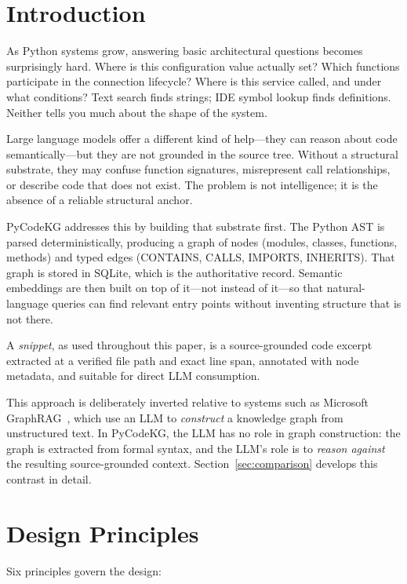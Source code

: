 \documentclass[10pt]{article}
\begin{document}
\section{Introduction}

As Python systems grow, answering basic architectural questions becomes surprisingly
hard. Where is this configuration value actually set? Which functions participate in
the connection lifecycle? Where is this service called, and under what conditions?
Text search finds strings; IDE symbol lookup finds definitions. Neither tells you
much about the shape of the system.

Large language models offer a different kind of help---they can reason about code
semantically---but they are not grounded in the source tree. Without a structural
substrate, they may confuse function signatures, misrepresent call relationships,
or describe code that does not exist. The problem is not intelligence; it is the
absence of a reliable structural anchor.

PyCodeKG addresses this by building that substrate first. The Python AST is parsed
deterministically, producing a graph of nodes (modules, classes, functions, methods)
and typed edges (CONTAINS, CALLS, IMPORTS, INHERITS). That graph is stored in
SQLite, which is the authoritative record. Semantic embeddings are then built on top
of it---not instead of it---so that natural-language queries can find relevant
entry points without inventing structure that is not there.

A \emph{snippet}, as used throughout this paper, is a source-grounded code excerpt
extracted at a verified file path and exact line span, annotated with node metadata,
and suitable for direct LLM consumption.

This approach is deliberately inverted relative to systems such as Microsoft
GraphRAG~\cite{edge2024graphrag}, which use an LLM to \emph{construct} a knowledge
graph from unstructured text. In PyCodeKG, the LLM has no role in graph construction:
the graph is extracted from formal syntax, and the LLM's role is to \emph{reason
against} the resulting source-grounded context. Section~\ref{sec:comparison} develops
this contrast in detail.

\section{Design Principles}

Six principles govern the design:
\end{document}
